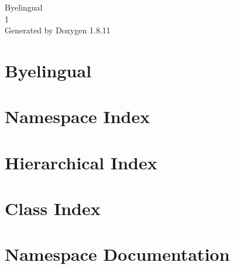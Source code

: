 \documentclass[twoside]{book}
\newcommand{\+}{\discretionary{\mbox{\scriptsize$\hookleftarrow$}}{}{}}
\newcommand{\clearemptydoublepage}{%
  \newpage{\pagestyle{empty}\cleardoublepage}%
}
\begin{document}
\hypersetup{pageanchor=false,
             bookmarksnumbered=true,
             pdfencoding=unicode
            }
\begin{titlepage}
\vspace*{7cm}
\begin{center}%
{\Large Byelingual \\[1ex]\large 1 }\\
\vspace*{1cm}
{\large Generated by Doxygen 1.8.11}\\
\end{center}
\end{titlepage}
\clearemptydoublepage
\tableofcontents
\clearemptydoublepage
{}
\hypersetup{pageanchor=true}

\chapter{Byelingual}
\label{md_README}
\hypertarget{md_README}{}

\chapter{Namespace Index}

\chapter{Hierarchical Index}

\chapter{Class Index}

\chapter{Namespace Documentation}







\end{document}
